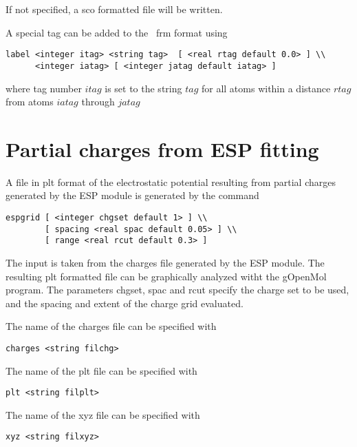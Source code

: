 If not specified, a {\rm sco} formatted file will be written.

A special tag can be added to the \ecce\ frm format using

\begin{verbatim}
label <integer itag> <string tag>  [ <real rtag default 0.0> ] \\
      <integer iatag> [ <integer jatag default iatag> ]
\end{verbatim}

where tag number $itag$ is set to the string $tag$ for all atoms
within a distance $rtag$ from atoms $iatag$ through $jatag$

\section{Partial charges from ESP fitting}

A file in plt format of the electrostatic potential resulting
from partial charges generated by the ESP module is generated
by the command

\begin{verbatim}
espgrid [ <integer chgset default 1> ] \\
        [ spacing <real spac default 0.05> ] \\
        [ range <real rcut default 0.3> ]
\end{verbatim}

The input is taken from the charges file generated by the ESP module. The
resulting plt formatted file can be graphically analyzed witht the
gOpenMol program. The parameters chgset, spac and rcut specify the
charge set to be used, and the spacing and extent of the charge grid
evaluated.

The name of the charges file can be specified with

\begin{verbatim}
charges <string filchg>
\end{verbatim}

The name of the plt file can be specified with

\begin{verbatim}
plt <string filplt>
\end{verbatim}

The name of the xyz file can be specified with

\begin{verbatim}
xyz <string filxyz>
\end{verbatim}

